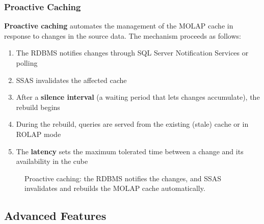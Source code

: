 \subsubsection{Proactive Caching}
\label{subsec:proactive-caching}

\textbf{Proactive caching} automates the management of the MOLAP cache in response to changes in the source data. The mechanism proceeds as follows:

\begin{enumerate}
    \item The RDBMS notifies changes through SQL Server Notification Services or polling
    \item SSAS invalidates the affected cache
    \item After a \textbf{silence interval} (a waiting period that lets changes accumulate), the rebuild begins
    \item During the rebuild, queries are served from the existing (stale) cache or in ROLAP mode
    \item The \textbf{latency} sets the maximum tolerated time between a change and its availability in the cube
\end{enumerate}

\begin{figure}[h]
\centering
{}
\caption{Proactive caching: the RDBMS notifies the changes, and SSAS invalidates and rebuilds the MOLAP cache automatically.}
\label{fig:proactive-caching}
\end{figure}

\subsection{Advanced Features}
\label{sec:ssas-advanced}

